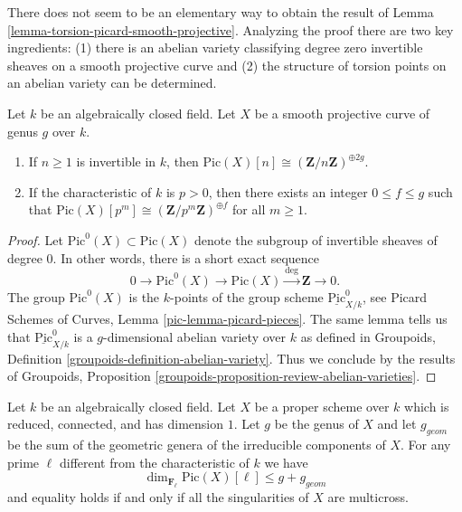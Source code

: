 \medskip\noindent
There does not seem to be an elementary way to obtain the result of
Lemma \ref{lemma-torsion-picard-smooth-projective}.
Analyzing the proof there are two key ingredients:
(1) there is an abelian variety classifying degree zero invertible sheaves on
a smooth projective curve and (2) the structure of torsion points on
an abelian variety can be determined.

\begin{lemma}
\label{lemma-torsion-picard-smooth-projective}
Let $k$ be an algebraically closed field.
Let $X$ be a smooth projective curve of genus $g$ over $k$.
\begin{enumerate}
\item If $n \geq 1$ is invertible in $k$, then
$\text{Pic}(X)[n] \cong (\mathbf{Z}/n\mathbf{Z})^{\oplus 2g}$.
\item If the characteristic of $k$ is $p > 0$, then there exists
an integer $0 \leq f \leq g$ such that
$\text{Pic}(X)[p^m] \cong (\mathbf{Z}/p^m\mathbf{Z})^{\oplus f}$ for
all $m \geq 1$.
\end{enumerate}
\end{lemma}

\begin{proof}
Let $\text{Pic}^0(X) \subset \text{Pic}(X)$
denote the subgroup of invertible sheaves of degree $0$.
In other words, there is a short exact sequence
$$
0 \to \text{Pic}^0(X) \to \text{Pic}(X) \xrightarrow{\deg} \mathbf{Z} \to 0.
$$
The group $\text{Pic}^0(X)$ is the $k$-points of
the group scheme $\underline{\text{Pic}}^0_{X/k}$, see
Picard Schemes of Curves, Lemma \ref{pic-lemma-picard-pieces}.
The same lemma tells us that $\underline{\text{Pic}}^0_{X/k}$
is a $g$-dimensional abelian variety over $k$ as defined in
Groupoids, Definition \ref{groupoids-definition-abelian-variety}.
Thus we conclude by the results of
Groupoids, Proposition \ref{groupoids-proposition-review-abelian-varieties}.
\end{proof}

\begin{proposition}
\label{proposition-torsion-picard-reduced-proper}
Let $k$ be an algebraically closed field. Let $X$ be a proper scheme over $k$
which is reduced, connected, and has dimension $1$. Let $g$ be the genus
of $X$ and let $g_{geom}$ be the sum of the geometric genera of the
irreducible components of $X$. For any prime $\ell$ different from
the characteristic of $k$ we have
$$
\dim_{\mathbf{F}_\ell} \text{Pic}(X)[\ell]
\leq g + g_{geom}
$$
and equality holds if and only if all the singularities of $X$
are multicross.
\end{proposition}

